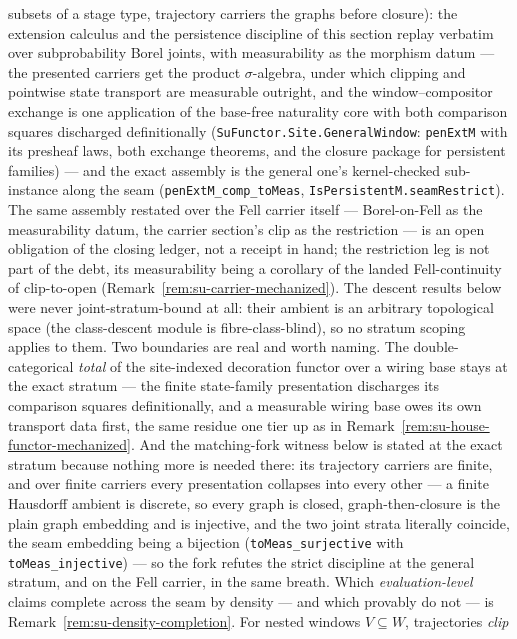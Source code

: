 subsets of a stage type, trajectory carriers the graphs before
closure): the extension calculus and the persistence discipline of
this section replay verbatim over subprobability Borel joints, with
measurability as the morphism datum --- the presented carriers get
the product $\sigma$-algebra, under which clipping and pointwise
state transport are measurable outright, and the window--compositor
exchange is one application of the base-free naturality core with
both comparison squares discharged definitionally
(\texttt{SuFunctor.Site.GeneralWindow}:
\texttt{penExtM} with its presheaf laws, both exchange theorems,
and the closure package for persistent families) --- and the exact
assembly is the general one's kernel-checked sub-instance along the
seam (\texttt{penExtM\_comp\_toMeas},
\texttt{IsPersistentM.seamRestrict}). The same assembly restated
over the Fell carrier itself --- Borel-on-Fell as the measurability
datum, the carrier section's clip as the restriction --- is an open
obligation of the closing ledger, not a receipt in hand; the
restriction leg is not part of the debt, its measurability being a
corollary of the landed Fell-continuity of clip-to-open
(Remark~\ref{rem:su-carrier-mechanized}). The descent results below
were never joint-stratum-bound at all: their ambient is an
arbitrary topological space (the class-descent module is
fibre-class-blind), so no stratum scoping applies to them. Two
boundaries are real and worth naming. The double-categorical
\emph{total} of the site-indexed decoration functor over a wiring
base stays at the exact stratum --- the finite state-family
presentation discharges its comparison squares definitionally, and
a measurable wiring base owes its own transport data first, the
same residue one tier up as in
Remark~\ref{rem:su-house-functor-mechanized}. And the matching-fork
witness below is stated at the exact stratum because nothing more
is needed there: its trajectory carriers are finite, and over
finite carriers every presentation collapses into every other ---
a finite Hausdorff ambient is discrete, so every graph is closed,
graph-then-closure is the plain graph embedding and is injective,
and the two joint strata literally coincide, the seam embedding
being a bijection (\texttt{toMeas\_surjective} with
\texttt{toMeas\_injective}) --- so the fork refutes the strict
discipline at the general stratum, and on the Fell carrier, in the
same breath. Which
\emph{evaluation-level} claims complete across the seam by density
--- and which provably do not --- is
Remark~\ref{rem:su-density-completion}.
For nested windows $V \subseteq W$, trajectories \emph{clip}
